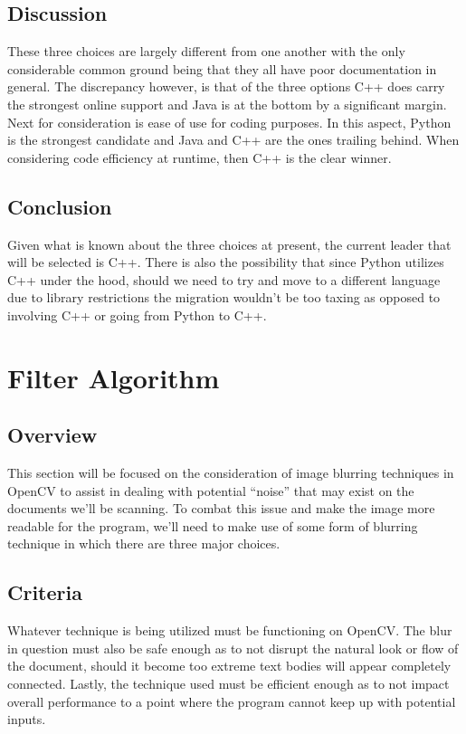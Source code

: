 \documentclass[onecolumn, draftclsnofoot,10pt, compsoc]{IEEEtran}
\begin{document}
\subsection{Discussion}
These three choices are largely different from one another with the only considerable common ground being that they all have poor documentation in general. The discrepancy however, is that of the three options C++ does carry the strongest online support and Java is at the bottom by a significant margin. Next for consideration is ease of use for coding purposes. In this aspect, Python is the strongest candidate and Java and C++ are the ones trailing behind. When considering code efficiency at runtime, then C++ is the clear winner.

\subsection{Conclusion}
Given what is known about the three choices at present, the current leader that will be selected is C++. There is also the possibility that since Python utilizes C++ under the hood, should we need to try and move to a different language due to library restrictions the migration wouldn’t be too taxing as opposed to involving C++ or going from Python to C++. 

\section{Filter Algorithm}
\subsection{Overview}
This section will be focused on the consideration of image blurring techniques in OpenCV to assist in dealing with potential “noise” that may exist on the documents we’ll be scanning. To combat this issue and make the image more readable for the program, we’ll need to make use of some form of blurring technique in which there are three major choices.

\subsection{Criteria}
Whatever technique is being utilized must be functioning on OpenCV. The blur in question must also be safe enough as to not disrupt the natural look or flow of the document, should it become too extreme text bodies will appear completely connected. Lastly, the technique used must be efficient enough as to not impact overall performance to a point where the program cannot keep up with potential inputs.
\end{document}
